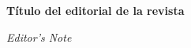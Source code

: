 \documentclass{article}
\renewcommand{\normalsize}{\fontsize{10pt}{13pt}\selectfont}
\newcommand{\articulotipo}{}
\newcommand{\articulotitulo}{}
\newcommand{\articulotitulotrans}{}
\newcommand{\articuloautores}{}
\newcommand{\articulodoi}{}
\newcommand{\articuloidiomaxml}{es}
\newcommand{\articulorevista}{}
\newcommand{\articuloissne}{}
\newcommand{\articulovolumen}{}
\newcommand{\articulonumero}{}
\newcommand{\articulofecha}{}
\newcommand{\articulopagina}{0}
\begin{document}

\renewcommand{\articuloidiomaxml}{es}
\renewcommand{\articulotitulo}{Título del editorial de la revista}
\renewcommand{\articuloautores}{Luciana Victoria Gil}
\renewcommand{\articulodoi}{doi}
\renewcommand{\articulotipo}{EDITORIAL}
\renewcommand{\articulorevista}{H-industria}
\renewcommand{\articuloissne}{1851-703X}
\renewcommand{\articulovolumen}{01}
\renewcommand{\articulonumero}{01}
\renewcommand{\articulofecha}{ 2026}
\renewcommand{\articulopagina}{1}

\setcounter{page}{1}
\thispagestyle{firstpage}

\noindent\begin{minipage}[t]{\dimexpr\textwidth+\marginparsep+\marginparwidth\relax}%
{\sffamily\bfseries\Large\articulotitulo\par}%
\end{minipage}\par
\vspace{3mm}%
\renewcommand{\articulotitulotrans}{Editor's Note}
\noindent\begin{minipage}[t]{\dimexpr\textwidth+\marginparsep+\marginparwidth\relax}%
{\sffamily\itshape\normalsize\articulotitulotrans\par}%
\end{minipage}\par
\vspace{4mm}%
\end{document}
